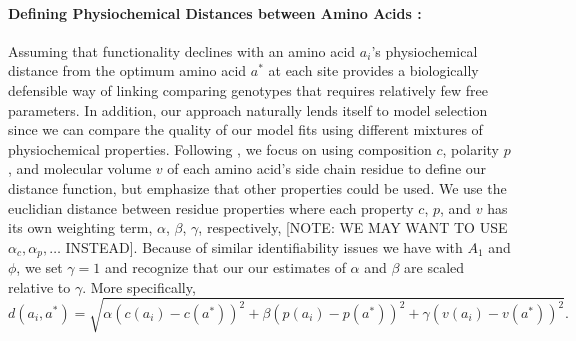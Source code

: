 \documentclass{article}
\newcommand{\aopt}{\ensuremath{a^*}\xspace}
\begin{document}
\paragraph*{Defining Physiochemical Distances between Amino Acids :}
Assuming that functionality declines with an amino acid $a_i$'s physiochemical distance from the optimum amino acid \aopt at each site  provides a biologically defensible way of linking comparing genotypes that requires relatively few free parameters.
In addition, our approach naturally lends itself to model selection since we can compare the quality of our model fits using different mixtures of physiochemical properties.
Following \citet{Grantham74}, we focus on using composition $c$, polarity $p$, and molecular volume $v$ of each amino acid's side chain residue to define our distance function, but emphasize that other properties could be used.
We use the euclidian distance between residue properties where each property $c$, $p$, and $v$ has its own weighting term, $\alpha$, $\beta$, $\gamma$, respectively, [NOTE: WE MAY WANT TO USE $\alpha_c, \alpha_p, \ldots $ INSTEAD].
Because of similar identifiability issues we have with $A_1$ and $\phi$, we set $\gamma = 1$ and recognize that our our estimates of $\alpha$ and $\beta$ are scaled relative to $\gamma$.
More specifically,
\begin{equation*}
  d(a_i, \aopt) = \sqrt{\alpha \left(c\left(a_i\right) - c\left(\aopt\right)\right)^2 + \beta \left(p\left(a_i\right) - p\left(\aopt\right)\right)^2 +  \gamma \left(v\left(a_i\right) - v\left(\aopt\right)\right)^2}.
\end{equation*}
\end{document}
